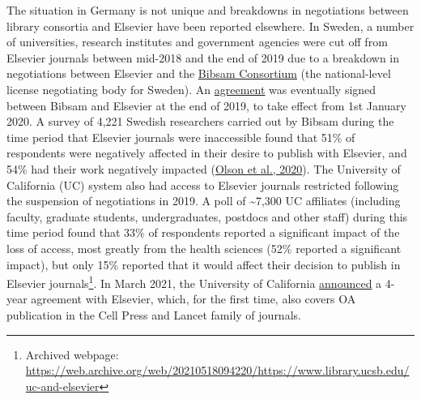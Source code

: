 \documentclass[
]{article}
\begin{document}
The situation in Germany is not unique and breakdowns in negotiations between library consortia and Elsevier have been reported elsewhere. In Sweden, a number of universities, research institutes and government agencies were cut off from Elsevier journals between mid-2018 and the end of 2019 due to a breakdown in negotiations between Elsevier and the \href{https://www.kb.se/samverkan-och-utveckling/oppen-tillgang-och-bibsamkonsortiet.html}{Bibsam Consortium} (the national-level license negotiating body for Sweden). An \href{https://www.kb.se/download/18.a9bd5bf1707b0801cd15e/1582893792629/Bibsam-Elsevier-2020-2022-tobepublished-titlelistexcluded.pdf}{agreement} was eventually signed between Bibsam and Elsevier at the end of 2019, to take effect from 1st January 2020. A survey of 4,221 Swedish researchers carried out by Bibsam during the time period that Elsevier journals were inaccessible found that 51\% of respondents were negatively affected in their desire to publish with Elsevier, and 54\% had their work negatively impacted (\href{http://doi.org/10.1629/uksg.507}{Olson et al., 2020}). The University of California (UC) system also had access to Elsevier journals restricted following the suspension of negotiations in 2019. A poll of \textasciitilde7,300 UC affiliates (including faculty, graduate students, undergraduates, postdocs and other staff) during this time period found that 33\% of respondents reported a significant impact of the loss of access, most greatly from the health sciences (52\% reported a significant impact), but only 15\% reported that it would affect their decision to publish in Elsevier journals\footnote{Archived webpage: \url{https://web.archive.org/web/20210518094220/https://www.library.ucsb.edu/uc-and-elsevier}}. In March 2021, the University of California \href{https://osc.universityofcalifornia.edu/2021/03/uc-secures-landmark-oa-deal-with-worlds-largest-scientific-publisher/}{announced} a 4-year agreement with Elsevier, which, for the first time, also covers OA publication in the Cell Press and Lancet family of journals.
\end{document}
